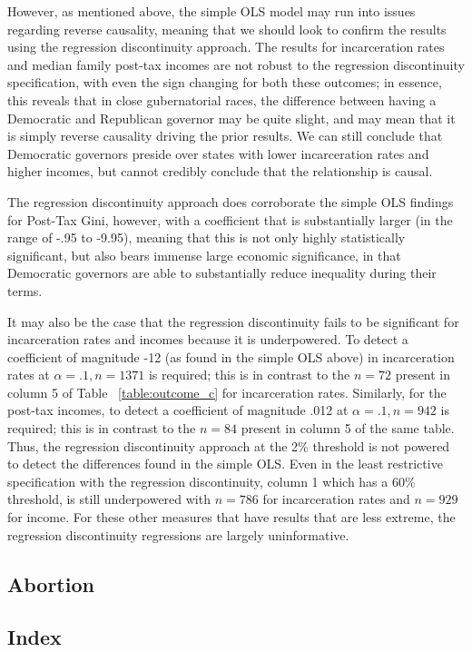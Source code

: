 \documentclass{article}
\begin{document}
However, as mentioned above, the simple OLS model may run into issues regarding reverse causality, meaning that we should look to confirm the results using the regression discontinuity approach. The results for incarceration rates and median family post-tax incomes are not robust to the regression discontinuity specification, with even the sign changing for both these outcomes; in essence, this reveals that in close gubernatorial races, the difference between having a Democratic and Republican governor may be quite slight, and may mean that it is simply reverse causality driving the prior results. We can still conclude that Democratic governors preside over states with lower incarceration rates and higher incomes, but cannot credibly conclude that the relationship is causal.

The regression discontinuity approach does corroborate the simple OLS findings for Post-Tax Gini, however, with a coefficient that is substantially larger (in the range of -.95 to -9.95), meaning that this is not only highly statistically significant, but also bears immense large economic significance, in that Democratic governors are able to substantially reduce inequality during their terms.

It may also be the case that the regression discontinuity fails to be significant for incarceration rates and incomes because it is underpowered. To detect a coefficient of magnitude -12 (as found in the simple OLS above) in incarceration rates at $\alpha = .1, n = 1371$ is required; this is in contrast to the $n = 72$  present in column 5 of Table ~\ref{table:outcome_c} for incarceration rates. Similarly, for the post-tax incomes, to detect a coefficient of magnitude .012 at $\alpha =.1, n = 942$ is required; this is in contrast to the $n = 84$ present in column 5 of the same table. Thus, the regression discontinuity approach at the 2\% threshold is not powered to detect the differences found in the simple OLS. Even in the least restrictive specification with the regression discontinuity, column 1 which has a 60\% threshold, is still underpowered with $n = 786$ for incarceration rates and $n = 929$ for income. For these other measures that have results that are less extreme, the regression discontinuity regressions are largely uninformative. 


\subsection{Abortion}


\subsection{Index}
\end{document}
